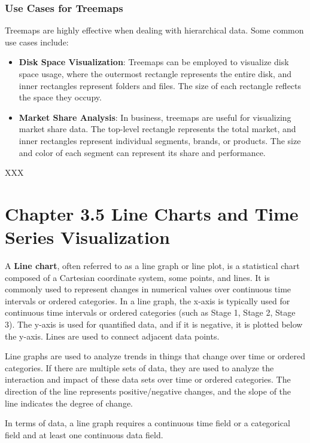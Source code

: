 \documentclass{article}\usepackage[]{graphicx}\usepackage[]{xcolor}
\begin{document}
\subsubsection{Use Cases for Treemaps}
Treemaps are highly effective when dealing with hierarchical data. Some common use cases include:
\begin{itemize}
\item \textbf{Disk Space Visualization}: Treemaps can be employed to visualize disk space usage, where the outermost rectangle represents the entire disk, and inner rectangles represent folders and files. The size of each rectangle reflects the space they occupy.
\item \textbf{Market Share Analysis}: In business, treemaps are useful for visualizing market share data. The top-level rectangle represents the total market, and inner rectangles represent individual segments, brands, or products. The size and color of each segment can represent its share and performance.
\end{itemize}

XXX %


\section*{Chapter 3.5 Line Charts and Time Series Visualization}

A \textbf{Line chart}, often referred to as a line graph or line plot, is a statistical chart composed of a Cartesian coordinate system, some points, and lines. It is commonly used to represent changes in numerical values over continuous time intervals or ordered categories. In a line graph, the x-axis is typically used for continuous time intervals or ordered categories (such as Stage 1, Stage 2, Stage 3). The y-axis is used for quantified data, and if it is negative, it is plotted below the y-axis. Lines are used to connect adjacent data points.

Line graphs are used to analyze trends in things that change over time or ordered categories. If there are multiple sets of data, they are used to analyze the interaction and impact of these data sets over time or ordered categories. The direction of the line represents positive/negative changes, and the slope of the line indicates the degree of change.

In terms of data, a line graph requires a continuous time field or a categorical field and at least one continuous data field.
\end{document}
